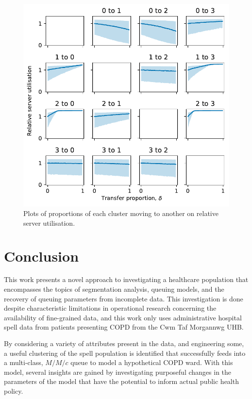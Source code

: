 \begin{figure}
    \centering
    \includegraphics[width=\imgwidth]{moving_util}
    \caption{%
        Plots of proportions of each cluster moving to another on relative
        server utilisation.
    }\label{fig:moving_util}
\end{figure}

\section{Conclusion}\label{sec:conclusion}

This work presents a novel approach to investigating a healthcare population
that encompasses the topics of segmentation analysis, queuing models, and the
recovery of queuing parameters from incomplete data. This investigation is done
despite characteristic limitations in operational research concerning the
availability of fine-grained data, and this work only uses administrative
hospital spell data from patients presenting COPD from the Cwm Taf Morgannwg
UHB.\

By considering a variety of attributes present in the data, and engineering
some, a useful clustering of the spell population is identified that
successfully feeds into a multi-class, \(M/M/c\) queue to model a hypothetical
COPD ward. With this model, several insights are gained by investigating
purposeful changes in the parameters of the model that have the potential to
inform actual public health policy.

